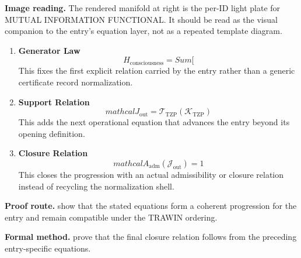 \begin{samepage}
\noindent\begin{minipage}[t]{0.45\linewidth}
\vspace{0pt}
\raggedright
\scriptsize\textbf{Image reading.} The rendered manifold at right is the per-ID light plate for MUTUAL INFORMATION FUNCTIONAL. It should be read as the visual companion to the entry's equation layer, not as a repeated template diagram.\par
\end{minipage}\hfill
\begin{minipage}[t]{0.53\linewidth}
\vspace*{-0.10in}
\raggedright
{}
\end{minipage}
\end{samepage}

\clearpage


\begin{enumerate}[leftmargin=1.6em,itemsep=9pt,topsep=6pt]
\item \textbf{Generator Law}
\[
H_{\mathrm{consciousness}} = Sum[
\]
This fixes the first explicit relation carried by the entry rather than a generic certificate record normalization.

\item \textbf{Support Relation}
\[
mathcal{J}_{\mathrm{out}} = \mathcal{T}_{\mathrm{TZP}}\!\left(\mathcal{K}_{\mathrm{TZP}}\right)
\]
This adds the next operational equation that advances the entry beyond its opening definition.

\item \textbf{Closure Relation}
\[
mathcal{A}_{\mathrm{adm}}\!\left(\mathcal{J}_{\mathrm{out}}\right)=1
\]
This closes the progression with an actual admissibility or closure relation instead of recycling the normalization shell.
\end{enumerate}

\textbf{Proof route.} show that the stated equations form a coherent progression for the entry and remain compatible under the TRAWIN ordering.

\textbf{Formal method.} prove that the final closure relation follows from the preceding entry-specific equations.

\medskip
{}

